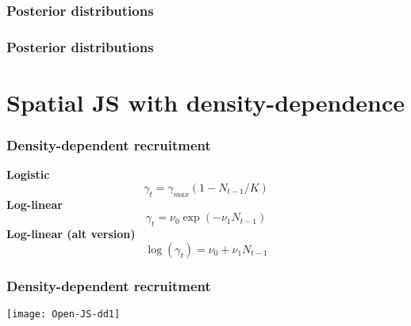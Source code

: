 \documentclass[color=usenames,dvipsnames]{beamer}
\begin{document}
\begin{frame}[fragile]
  \frametitle{Posterior distributions}
\begin{center}
\end{center}
\end{frame}






\begin{frame}[fragile]
  \frametitle{Posterior distributions}
\begin{center}
\end{center}
\end{frame}
















\section{Spatial JS with density-dependence}









\begin{frame}
  \frametitle{Density-dependent recruitment}
  \large
  {\bf Logistic}
  \[
     \gamma_t = \gamma_{max}(1 - N_{t-1}/K)
  \]
  \vfill
  {\bf Log-linear}
  \[
     \gamma_t = \nu_0\exp(-\nu_1 N_{t-1})
  \]
  \vfill
  {\bf Log-linear (alt version)}
  \[
    \log(\gamma_t) = \nu_0 + \nu_1 N_{t-1}
  \]
\end{frame}






\begin{frame}[fragile]
  \frametitle{Density-dependent recruitment}
  \tiny
\vspace{-4mm}
\begin{center}
  \texttt{[image: Open-JS-dd1]}
\end{center}
\end{frame}
\end{document}
